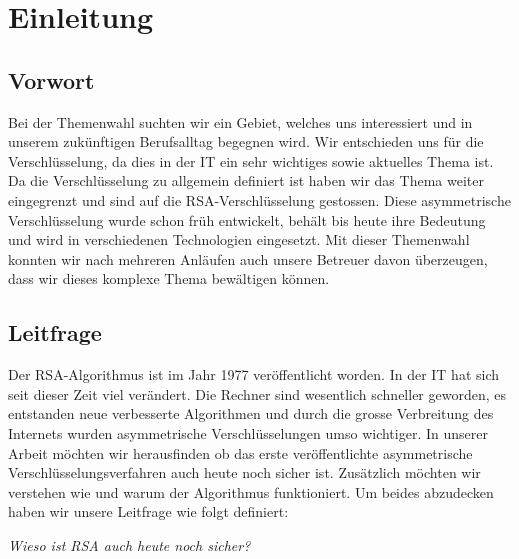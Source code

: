 \section{Einleitung}
\subsection{Vorwort}
Bei der Themenwahl suchten wir ein Gebiet, welches uns interessiert und in unserem zukünftigen Berufsalltag begegnen wird. Wir entschieden uns für die Verschlüsselung, da dies in der IT ein sehr wichtiges sowie aktuelles Thema ist. Da die Verschlüsselung zu allgemein definiert ist haben wir das Thema weiter eingegrenzt und sind auf die RSA-Verschlüsselung gestossen. Diese asymmetrische Verschlüsselung wurde schon früh entwickelt, behält bis heute ihre Bedeutung und wird in verschiedenen Technologien eingesetzt. Mit dieser Themenwahl konnten wir nach mehreren Anläufen auch unsere Betreuer davon überzeugen, dass wir dieses komplexe Thema bewältigen können. 
%
\subsection{Leitfrage}
Der RSA-Algorithmus ist im Jahr 1977 veröffentlicht worden. In der IT hat sich seit dieser Zeit viel verändert. Die Rechner sind wesentlich schneller geworden, es entstanden neue verbesserte Algorithmen und durch die grosse Verbreitung des Internets wurden asymmetrische Verschlüsselungen umso wichtiger. In unserer Arbeit möchten wir herausfinden ob das erste veröffentlichte asymmetrische Verschlüsselungsverfahren auch heute noch sicher ist. Zusätzlich möchten wir verstehen wie und warum der Algorithmus funktioniert. Um beides abzudecken haben wir unsere Leitfrage wie folgt definiert:\\
\begin{center}\textit{Wieso ist RSA auch heute noch sicher?}\end{center}
